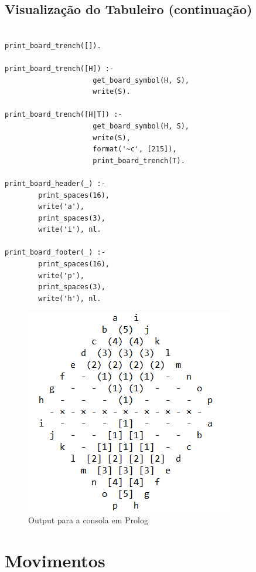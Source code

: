\newpage

\subsection{Visualização do Tabuleiro (continuação)}

\begin{lstlisting}

print_board_trench([]).

print_board_trench([H]) :-
                     get_board_symbol(H, S),
                     write(S).

print_board_trench([H|T]) :-
                     get_board_symbol(H, S),
                     write(S),
                     format('~c', [215]),
                     print_board_trench(T).

print_board_header(_) :-
        print_spaces(16),
        write('a'),
        print_spaces(3),
        write('i'), nl.

print_board_footer(_) :-
        print_spaces(16),
        write('p'),
        print_spaces(3),
        write('h'), nl.

\end{lstlisting}

\begin{figure}[h!]
\begin{center}
\includegraphics[scale=0.7]{img/output.png}
\caption{Output para a consola em Prolog}
\label{fig:7}
\end{center}
\end{figure}

\newpage

\section{Movimentos}

